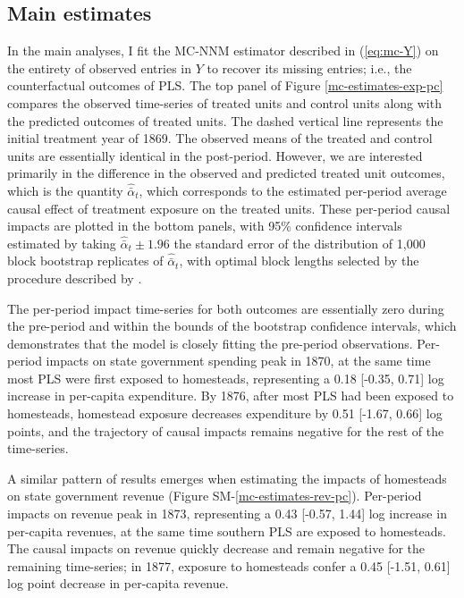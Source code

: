 \documentclass[hidelinks,12pt]{article}
\begin{document}
\subsection{Main estimates} \label{main-estimates}

In the main analyses, I fit the MC-NNM estimator described in (\ref{eq:mc-Y}) on the entirety of observed entries in $Y$ to recover its missing entries; i.e., the counterfactual outcomes of PLS. The top panel of Figure \ref{mc-estimates-exp-pc} compares the observed time-series of treated units and control units along with the predicted outcomes of treated units. The dashed vertical line represents the initial treatment year of 1869. The observed means of the treated and control units are essentially identical in the post-period. However, we are interested primarily in the difference in the observed and predicted treated unit outcomes, which is the quantity $\hat{\bar{\alpha}}_{t}$, which corresponds to the estimated per-period average causal effect of treatment exposure on the treated units. These per-period causal impacts are plotted in the bottom panels, with 95\% confidence intervals estimated by taking $\hat{\bar{\alpha}}_{t} \pm 1.96$ the standard error of the distribution of 1,000 block bootstrap replicates of $\hat{\bar{\alpha}}_{t}$, with optimal block lengths selected by the procedure described by \citet{politis2004automatic}. 

The per-period impact time-series for both outcomes are essentially zero during the pre-period and within the bounds of the bootstrap confidence intervals, which demonstrates that the model is closely fitting the pre-period observations. Per-period impacts on state government spending peak in 1870, at the same time most PLS were first exposed to homesteads, representing a 0.18 [-0.35, 0.71] log increase in per-capita expenditure. By 1876, after most PLS had been exposed to homesteads, homestead exposure decreases expenditure by 0.51 [-1.67, 0.66] log points, and the trajectory of causal impacts remains negative for the rest of the time-series.

A similar pattern of results emerges when estimating the impacts of homesteads on state government revenue (Figure SM-\ref{mc-estimates-rev-pc}). Per-period impacts on revenue peak in 1873, representing a 0.43 [-0.57, 1.44] log increase in per-capita revenues, at the same time southern PLS are exposed to homesteads. The causal impacts on revenue quickly decrease and remain negative for the remaining time-series; in 1877, exposure to homesteads confer a 0.45 [-1.51, 0.61] log point decrease in per-capita revenue. 
\end{document}

